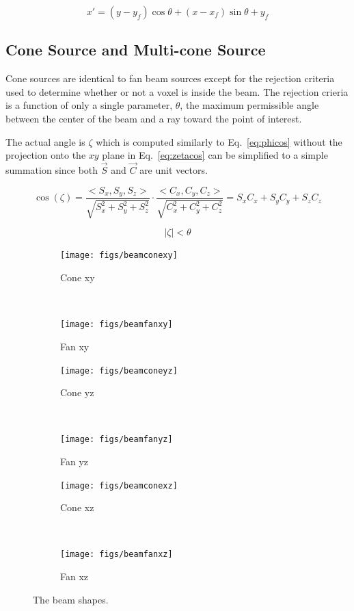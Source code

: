 \begin{equation}\label{eq:yp2}
x' = (y - y_f) \cos \theta + (x - x_f) \sin \theta + y_f
\end{equation}

\subsection{Cone Source and Multi-cone Source}
Cone sources are identical to fan beam sources except for the rejection criteria used to determine whether or not a voxel is inside the beam. The rejection crieria is a function of only a single parameter, $\theta$, the maximum permissible angle between the center of the beam and a ray toward the point of interest.

The actual angle is $\zeta$ which is computed similarly to Eq.~\ref{eq:phicos} without the projection onto the $xy$ plane in Eq.~\ref{eq:zetacos} can be simplified to a simple summation since both $\vec{S}$ and $\vec{C}$ are unit vectors.

\begin{equation}\label{eq:zetacos}
\cos(\zeta) = \frac{<S_x, S_y, S_z>}{\sqrt{S_x^2 + S_y^2 + S_z^2}} \cdot \frac{<C_x, C_y, C_z>}{\sqrt{C_x^2 + C_y^2 + C_z^2}} = S_x C_x + S_y C_y + S_z C_z
\end{equation}

\begin{equation}\label{eq:zetacon}
|\zeta| < \theta
\end{equation}

\begin{figure}
    \centering
    \begin{subfigure}[b]{0.45\textwidth}
        \texttt{[image: figs/beamconexy]}
        \caption{Cone xy}
        \label{fig:beamconexy}
    \end{subfigure}
    ~
    \begin{subfigure}[b]{0.45\textwidth}
        \texttt{[image: figs/beamfanxy]}
        \caption{Fan xy}
        \label{fig:beamfanxy}
    \end{subfigure}

    \begin{subfigure}[b]{0.45\textwidth}
        \texttt{[image: figs/beamconeyz]}
        \caption{Cone yz}
        \label{fig:subsweep_general3}
    \end{subfigure}
    ~
    \begin{subfigure}[b]{0.45\textwidth}
        \texttt{[image: figs/beamfanyz]}
        \caption{Fan yz}
        \label{fig:subsweep_general4}
    \end{subfigure}
    
    \begin{subfigure}[b]{0.45\textwidth}
        \texttt{[image: figs/beamconexz]}
        \caption{Cone xz}
        \label{fig:subsweep_general5}
    \end{subfigure}
    ~
    \begin{subfigure}[b]{0.45\textwidth}
        \texttt{[image: figs/beamfanxz]}
        \caption{Fan xz}
        \label{fig:subsweep_general6}
    \end{subfigure}
    \caption{The beam shapes.}\label{fig:beamfancone}
\end{figure}


